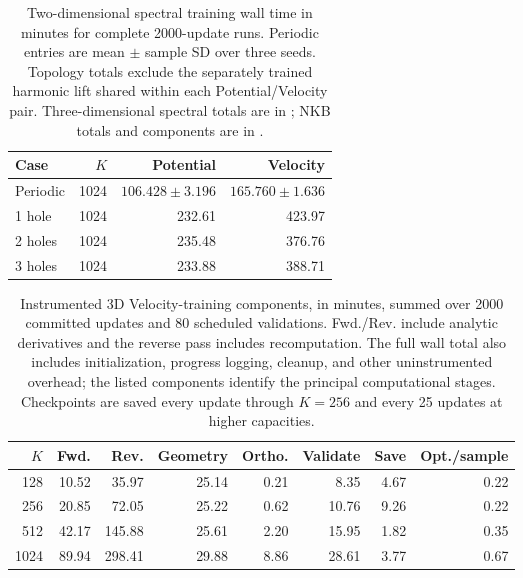 \begin{table}[!htb]\centering\footnotesize\setlength{\tabcolsep}{4pt}
\caption{Two-dimensional spectral training wall time in minutes for complete 2000-update runs. Periodic entries are mean $\pm$ sample SD over three seeds. Topology totals exclude the separately trained harmonic lift shared within each Potential/Velocity pair. Three-dimensional spectral totals are in ; NKB totals and components are in .}
\label{tab:runtime-training}
\label{tab:k1024-cost}
\begin{tabular}{lrrr}\toprule
Case&$K$&Potential&Velocity\\\midrule
Periodic & 1024 & $106.428\pm3.196$ & $165.760\pm1.636$\\
1 hole & 1024 & 232.61 & 423.97\\
2 holes & 1024 & 235.48 & 376.76\\
3 holes & 1024 & 233.88 & 388.71\\
\bottomrule\end{tabular}\end{table}
\begin{table}[!htb]\centering\footnotesize\setlength{\tabcolsep}{4pt}
\caption{Instrumented 3D Velocity-training components, in minutes, summed over 2000 committed updates and 80 scheduled validations. Fwd./Rev. include analytic derivatives and the reverse pass includes recomputation. The full wall total also includes initialization, progress logging, cleanup, and other uninstrumented overhead; the listed components identify the principal computational stages. Checkpoints are saved every update through $K=256$ and every 25 updates at higher capacities.}
\label{tab:runtime-training-components}

\begin{tabular}{rrrrrrrr}\toprule
$K$&Fwd.&Rev.&Geometry&Ortho.&Validate&Save&Opt./sample\\\midrule
128 & 10.52 & 35.97 & 25.14 & 0.21 & 8.35 & 4.67 & 0.22\\
256 & 20.85 & 72.05 & 25.22 & 0.62 & 10.76 & 9.26 & 0.22\\
512 & 42.17 & 145.88 & 25.61 & 2.20 & 15.95 & 1.82 & 0.35\\
1024 & 89.94 & 298.41 & 29.88 & 8.86 & 28.61 & 3.77 & 0.67\\
\bottomrule\end{tabular}\end{table}
